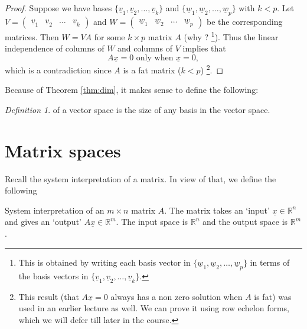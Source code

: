 \documentclass{tufte-handout}
\theoremstyle{remark}
\newtheorem*{defn}{Definition}
\renewcommand{\vec}[1]{\underline{#1}}
\begin{document}
\begin{proof}
Suppose we have bases $\{\vec{v}_1, \vec{v}_2, \ldots, \vec{v}_k \}$ and $\{\vec{w}_1, \vec{w}_2, \ldots, \vec{w}_p \}$ with $k < p$. Let \(V = \begin{pmatrix} \vec{v}_1 & \vec{v}_2 & \ldots & \vec{v}_k \end{pmatrix}\) and \(W = \begin{pmatrix} \vec{w}_1 & \vec{w}_2 & \ldots & \vec{w}_p \end{pmatrix}\) be the corresponding matrices. Then $W = V A$ for some $k \times p$ matrix $A$ (why ? \footnote{This is obtained by writing each basis vector in $\{\vec{w}_1, \vec{w}_2, \ldots, \vec{w}_p \}$ in terms of the basis vectors in $\{\vec{v}_1, \vec{v}_2, \ldots, \vec{v}_k \}$.}). Thus the linear independence of columns of $W$ and columns of $V$ implies that 
\[
A\vec{x} = 0 \text{ only when } \vec{x}=0,
\]
which is a contradiction since $A$ is a fat matrix ($k<p$) \footnote{This result (that $A\vec{x}=0$ always has a non zero solution when $A$ is fat) was used in an earlier lecture as well. We can prove it using row echelon forms, which we will defer till later in the course.}.
\end{proof}
Because of Theorem \ref{thm:dim}, it makes sense to define the following:

\begin{defn}
 of a vector space is the size of any basis in the vector space. 
\end{defn}


\section{Matrix spaces}
Recall the system interpretation of a matrix. In view of that, we define the following \begin{marginfigure}
\begin{center}
    

\end{center}
\caption{System interpretation of an $m \times n$ matrix $A$. The matrix takes an `input' $\vec{x} \in \mathbb{R}^n$ and gives an `output' $A \vec{x} \in \mathbb{R}^m$. The input space is $\mathbb{R}^n$ and the output space is $\mathbb{R}^m$.}
\end{marginfigure}
\end{document}
